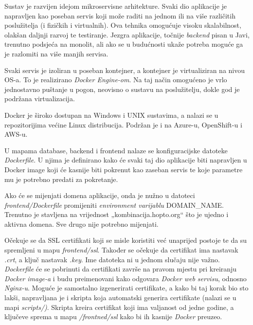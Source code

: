 		
		Sustav je razvijen idejom mikroservisne arhitekture. Svaki dio aplikacije je napravljen kao poseban servis koji može raditi na jednom ili na više različitih poslužitelja (i fizičkih i virtualnih). Ova tehnika omogućuje visoku skalabilnost, olakšan daljnji razvoj te testiranje. Jezgra aplikacije, točnije  \textit{backend} pisan u Javi, trenutno podsjeća na monolit, ali ako se u budućnosti ukaže potreba moguće ga je razlomiti na više manjih servisa. 

		Svaki servis je izoliran u poseban kontejner, a kontejner je virtualiziran na nivou OS-a. To je realizirano  \textit{Docker Engine-om}. Na taj način omogućeno je vrlo jednostavno puštanje u pogon, neovisno o sustavu na poslužitelju, dokle god je podržana virtualizacija. 

		Docker je široko dostupan na Windows i UNIX sustavima, a nalazi se u repozitorijima većine Linux distribucija. Podržan je i na Azure-u, OpenShift-u i AWS-u.\\
		
		
		
	
		U mapama database, backend i frontend nalaze se konfiguracijske datoteke  \textit{Dockerfile}. U njima je definirano kako će svaki taj dio aplikacije biti napravljen u Docker image koji će kasnije biti pokrenut kao zaseban servis te koje parametre mu je potrebno predati za pokretanje. 
			
			Ako će se mijenjati domena aplikacije, onda je nužno u datoteci  \textit{frontend/Dockerfile} promijeniti  \textit{environment varijablu} DOMAIN\_NAME. Trenutno je stavljena na vrijednost „kombinacija.hopto.org“ što je ujedno i aktivna domena. Sve drugo nije potrebno mijenjati.
			
			
Očekuje se da SSL certifikati koji se misle koristiti već unaprijed postoje te da su spremljeni u mapu \textit{frontend/ssl}. Također se očekuje da certifikat ima nastavak \textit{.crt}, a ključ nastavak \textit{.key}. Ime datoteka ni u jednom slučaju nije važno. \textit{Dockerfile} će se pobrinuti da certifikati završe na pravom mjestu pri kreiranju \textit{Docker image-a} i budu preimenovani kako odgovara \textit{Docker web servisu}, odnosno \textit{Nginx-u}. Moguće je samostalno izgenerirati certifikate, a kako bi taj korak bio sto lakši, napravljana je i skripta koja automatski generira certifikate (nalazi se u mapi \textit{scripts/)}. Skripta kreira certifikat koji ima valjanost od jedne godine, a ključeve sprema u mapu \textit{/frontned/ssl} kako bi ih kasnije \textit{Docker} preuzeo.
			

